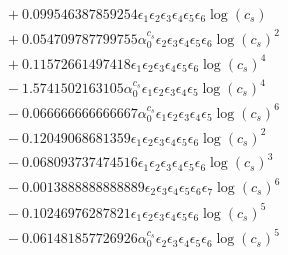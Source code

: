 \documentclass[10pt]{article}
\begin{document}
\begin{align*}
&{}  + 0.099546387859254 \epsilon_{1} \epsilon_{2} \epsilon_{3} \epsilon_{4} \epsilon_{5} \epsilon_{6} \log{\left(c_{s} \right)} \\
&{}  + 0.054709787799755 \alpha_{0}^{c_s} \epsilon_{2} \epsilon_{3} \epsilon_{4} \epsilon_{5} \epsilon_{6} \log{\left(c_{s} \right)}^{2} \\
&{}  + 0.11572661497418 \epsilon_{1} \epsilon_{2} \epsilon_{3} \epsilon_{4} \epsilon_{5} \epsilon_{6} \log{\left(c_{s} \right)}^{4} \\
&{}  - 1.5741502163105 \alpha_{0}^{c_s} \epsilon_{1} \epsilon_{2} \epsilon_{3} \epsilon_{4} \epsilon_{5} \log{\left(c_{s} \right)}^{4} \\
&{}  - 0.066666666666667 \alpha_{0}^{c_s} \epsilon_{1} \epsilon_{2} \epsilon_{3} \epsilon_{4} \epsilon_{5} \log{\left(c_{s} \right)}^{6} \\
&{}  - 0.12049068681359 \epsilon_{1} \epsilon_{2} \epsilon_{3} \epsilon_{4} \epsilon_{5} \epsilon_{6} \log{\left(c_{s} \right)}^{2} \\
&{}  - 0.068093737474516 \epsilon_{1} \epsilon_{2} \epsilon_{3} \epsilon_{4} \epsilon_{5} \epsilon_{6} \log{\left(c_{s} \right)}^{3} \\
&{}  - 0.0013888888888889 \epsilon_{2} \epsilon_{3} \epsilon_{4} \epsilon_{5} \epsilon_{6} \epsilon_{7} \log{\left(c_{s} \right)}^{6} \\
&{}  - 0.10246976287821 \epsilon_{1} \epsilon_{2} \epsilon_{3} \epsilon_{4} \epsilon_{5} \epsilon_{6} \log{\left(c_{s} \right)}^{5} \\
&{}  - 0.061481857726926 \alpha_{0}^{c_s} \epsilon_{2} \epsilon_{3} \epsilon_{4} \epsilon_{5} \epsilon_{6} \log{\left(c_{s} \right)}^{5}
\end{align*}
\end{document}
